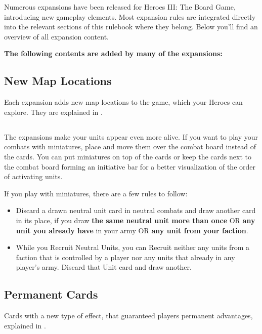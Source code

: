 
Numerous expansions have been released for Heroes III: The Board Game, introducing new gameplay elements.
Most expansion rules are integrated directly into the relevant sections of this rulebook where they belong.
Below you'll find an overview of all expansion content.

\vspace*{1em}

\textbf{The following contents are added by many of the expansions:}
\begin{multicols*}{2}
\subsection*{New Map Locations}
Each expansion adds new map locations to the game, which your Heroes can explore.
They are explained in .

\subsection*{}
The expansions make your units appear even more alive. 
If you want to play your combats with miniatures, place and move them over the combat board instead of the cards. 
You can put miniatures on top of the cards or keep the cards next to the combat board forming an initiative bar for a better visualization of the order of activating units.\par
\vspace*{1em}
If you play with miniatures, there are a few rules to follow:
\begin{itemize}
	\item Discard a drawn neutral unit card in neutral combats and draw another card in its place, if you draw \textbf{the same neutral unit more than once} OR \textbf{any unit you already have} in your army OR \textbf{any unit from your faction}. 
	\item While you Recruit Neutral Units, you can Recruit neither any units from a faction that is controlled by a player nor any units that already in any player's army. 
	Discard that Unit card and draw another. 
\end{itemize}

\subsection*{Permanent Cards}
Cards with a new type of effect, that guaranteed players permanent advantages, explained in .


\end{multicols*}
